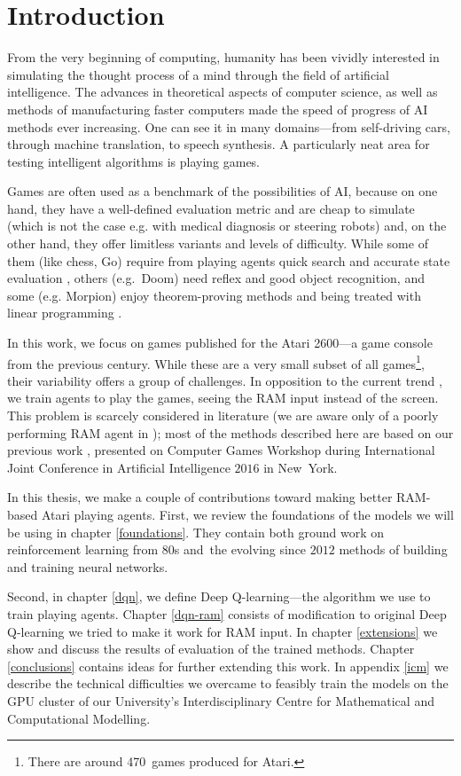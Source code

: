 \chapter*{Introduction}
From the very beginning of computing, humanity has been vividly interested in simulating the thought process of a mind through the field of artificial intelligence. The advances in theoretical aspects of computer science, as well as methods of manufacturing faster computers made the speed of progress of AI methods ever increasing. One can see it in many domains---from self-driving cars, through machine translation, to speech synthesis. A particularly neat area for testing intelligent algorithms is playing games.

Games are often used as a benchmark of the possibilities of AI, because on one hand, they have a well-defined evaluation metric and are cheap to simulate (which is not the case e.g. with medical diagnosis or steering robots) and, on the other hand, they offer limitless variants and levels of difficulty. While some of them (like chess, Go) require from playing agents quick search and accurate state evaluation \cite{alphago}, others (e.g.~Doom) need reflex and good object recognition, and some (e.g. Morpion) enjoy theorem-proving methods and being treated with linear programming \cite{morpion}.

In this work, we focus on games published for the Atari 2600---a game console from the previous century. While these are a very small subset of all games\footnote{There are around 470~games produced for Atari.}, their variability offers a group of challenges. In opposition to the current trend \cite{nips-dqn, nature-dqn, a3c}, we train agents to play the games, seeing the RAM input instead of the screen. This problem is scarcely considered in literature (we are aware only of a poorly performing RAM agent in \cite{ale}); most of the methods described here are based on our previous work \cite{our-paper}, presented on Computer Games Workshop during International Joint Conference in Artificial Intelligence $2016$ in New~York.

In this thesis, we make a couple of contributions toward making better RAM-based Atari playing agents. First, we review the foundations of the models we will be using in chapter \ref{foundations}. They contain both ground work on reinforcement learning from 80s and~the evolving since $2012$ methods of building and training neural networks.

Second, in chapter \ref{dqn}, we define Deep Q-learning---the algorithm we use to train playing agents.
Chapter \ref{dqn-ram} consists of modification to original Deep Q-learning we tried to make it work for RAM input.
In chapter \ref{extensions} we show and discuss the results of evaluation of the trained methods.
Chapter \ref{conclusions} contains ideas for further extending this work.
In appendix \ref{icm} we describe the technical difficulties we overcame to feasibly train the models on the GPU cluster of our University's Interdisciplinary Centre for Mathematical and Computational Modelling.
